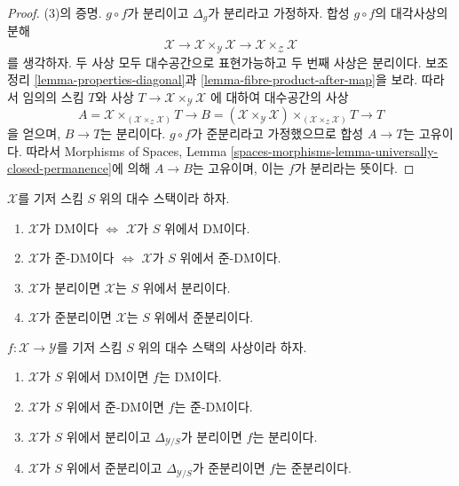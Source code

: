 \begin{proof}
\medskip\noindent
(3)의 증명. $g \circ f$가 분리이고 $\Delta_g$가 분리라고
가정하자. 합성 $g \circ f$의 대각사상의 분해
$$
\mathcal{X} \to
\mathcal{X} \times_\mathcal{Y} \mathcal{X} \to
\mathcal{X} \times_\mathcal{Z} \mathcal{X}
$$
를 생각하자. 두 사상 모두 대수공간으로 표현가능하고 두 번째 사상은
분리이다. 보조정리 \ref{lemma-properties-diagonal}과
\ref{lemma-fibre-product-after-map}을 보라.
따라서 임의의 스킴 $T$와 사상
$T \to \mathcal{X} \times_\mathcal{Y} \mathcal{X}$
에 대하여 대수공간의 사상
$$
A = \mathcal{X} \times_{(\mathcal{X} \times_\mathcal{Z} \mathcal{X})} T
\longrightarrow
B = (\mathcal{X} \times_\mathcal{Y} \mathcal{X})
\times_{(\mathcal{X} \times_\mathcal{Z} \mathcal{X})} T
\longrightarrow
T
$$
을 얻으며, $B \to T$는 분리이다. $g \circ f$가 준분리라고
가정했으므로 합성 $A \to T$는 고유이다. 따라서
Morphisms of Spaces, Lemma
\ref{spaces-morphisms-lemma-universally-closed-permanence}에 의해
$A \to B$는 고유이며, 이는 $f$가 분리라는 뜻이다.
\end{proof}

\begin{lemma}
\label{lemma-separated-implies-morphism-separated}
$\mathcal{X}$를 기저 스킴 $S$ 위의 대수 스택이라 하자.
\begin{enumerate}
\item
$\mathcal{X}$가 DM이다 $\Leftrightarrow$
$\mathcal{X}$가 $S$ 위에서 DM이다.
\item
$\mathcal{X}$가 준-DM이다 $\Leftrightarrow$
$\mathcal{X}$가 $S$ 위에서 준-DM이다.
\item $\mathcal{X}$가 분리이면 $\mathcal{X}$는 $S$ 위에서 분리이다.
\item $\mathcal{X}$가 준분리이면 $\mathcal{X}$는 $S$ 위에서 준분리이다.
\end{enumerate}
$f : \mathcal{X} \to \mathcal{Y}$를 기저 스킴 $S$ 위의
대수 스택의 사상이라 하자.
\begin{enumerate}
\item[(5)] $\mathcal{X}$가 $S$ 위에서 DM이면 $f$는 DM이다.
\item[(6)] $\mathcal{X}$가 $S$ 위에서 준-DM이면 $f$는 준-DM이다.
\item[(7)] $\mathcal{X}$가 $S$ 위에서 분리이고
$\Delta_{\mathcal{Y}/S}$가 분리이면 $f$는 분리이다.
\item[(8)] $\mathcal{X}$가 $S$ 위에서 준분리이고
$\Delta_{\mathcal{Y}/S}$가 준분리이면 $f$는 준분리이다.
\end{enumerate}
\end{lemma}

